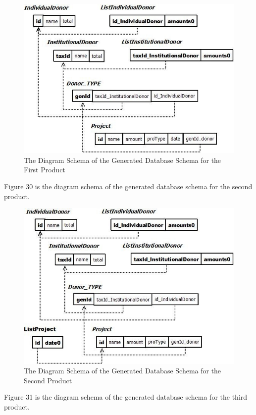 \documentclass[runningheads,a4paper]{llncs}
\begin{document}
\begin{figure}
	\centering
	\includegraphics[scale=0.6]{Eval1.jpg}
	\caption{The Diagram Schema of the Generated Database Schema for the First Product}
	\label{Figure 29}
\end{figure}

Figure 30 is the diagram schema of the generated database schema for the second product.

\begin{figure}
	\centering
	\includegraphics[scale=0.6]{Eval2.jpg}
	\caption{The Diagram Schema of the Generated Database Schema for the Second Product}
	\label{Figure 30}
\end{figure}

Figure 31 is the diagram schema of the generated database schema for the third product.
\end{document}
